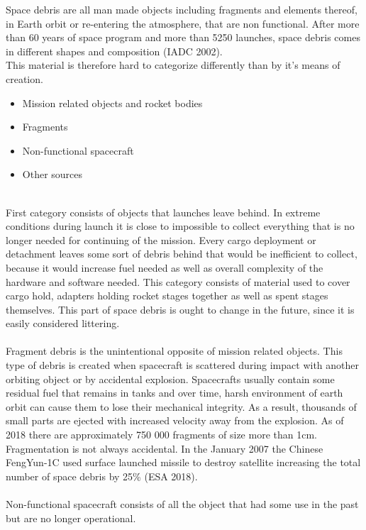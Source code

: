 \documentclass[12pt, a4paper, oneside]{book}
\begin{document}
Space debris are all man made objects including fragments and elements thereof, in Earth orbit or re-entering the atmosphere, that are non functional.
After more than 60 years of space program and more than 5250 launches, space debris comes in different shapes and composition (IADC 2002).\\
This material is therefore hard to categorize differently than by it's means of creation. \\
\begin{itemize}
    \item Mission related objects and rocket bodies
    \item Fragments
    \item Non-functional spacecraft
    \item Other sources
\end{itemize}
\\
    First category consists of objects that launches leave behind.
In extreme conditions during launch it is close to impossible to collect everything that is no longer needed for continuing of the mission.
Every cargo deployment or detachment leaves some sort of debris behind that would be inefficient to collect, because it would increase fuel needed as well as overall complexity of the hardware and software needed.
This category consists of material used to cover cargo hold, adapters holding rocket stages together as well as spent stages themselves.
This part of space debris is ought to change in the future, since it is easily considered littering.\\
\\
    Fragment debris is the unintentional opposite of mission related objects.
This type of debris is created when spacecraft is scattered during impact with another orbiting object or by accidental explosion.
Spacecrafts usually contain some residual fuel that remains in tanks and over time, harsh environment of earth orbit can cause them to lose their mechanical integrity.
As a result, thousands of small parts are ejected with increased velocity away from the explosion.
As of 2018 there are approximately 750 000 fragments of size more than 1cm.
Fragmentation is not always accidental. In the January 2007 the Chinese FengYun-1C used surface launched missile to destroy satellite increasing the total number of space debris by 25\% (ESA 2018).\\
\\
    Non-functional spacecraft consists of all the object that had some use in the past but are no longer operational.
\end{document}
